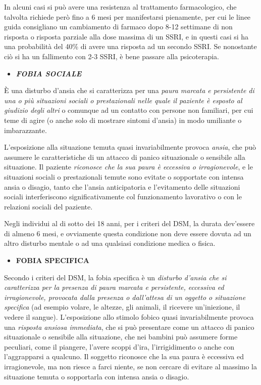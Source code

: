 \documentclass[]{article}
\begin{document}
In alcuni casi si può avere una resistenza al trattamento farmacologico,
che talvolta richiede però fino a 6 mesi per manifestarsi pienamente,
per cui le linee guida consigliano un cambiamento di farmaco dopo 8-12
settimane di non risposta o risposta parziale alla dose massima di un
SSRI, e in questi casi si ha una probabilità del 40\% di avere una
risposta ad un secondo SSRI. Se nonostante ciò si ha un fallimento con
2-3 SSRI, è bene passare alla psicoterapia.

\begin{itemize}
\item
  \textbf{\emph{FOBIA SOCIALE}}
\end{itemize}

È una disturbo d'ansia che si caratterizza per una \emph{paura marcata e
persistente di una o più situazioni sociali o prestazionali nelle quale
il paziente è esposto al giudizio degli altri} o comunque ad un contatto
con persone non familiari, per cui teme di agire (o anche solo di
mostrare sintomi d'ansia) in modo umiliante o imbarazzante.

L'esposizione alla situazione temuta quasi invariabilmente provoca
\emph{ansia}, che può assumere le caratteristiche di un attacco di
panico situazionale o sensibile alla situazione. Il paziente
\emph{riconosce che la sua paura è eccessiva o irragionevole}, e le
situazioni sociali o prestazionali temute sono evitate o sopportate con
intensa ansia o disagio, tanto che l'ansia anticipatoria e l'evitamento
delle situazioni sociali interferiscono significativamente col
funzionamento lavorativo o con le relazioni sociali del paziente.

Negli individui al di sotto dei 18 anni, per i criteri del DSM, la
durata dev'essere di almeno 6 mesi, e ovviamente questa condizione non
deve essere dovuta ad un altro disturbo mentale o ad una qualsiasi
condizione medica o fisica.

\begin{itemize}
\item
  \textbf{FOBIA SPECIFICA}
\end{itemize}

Secondo i criteri del DSM, la fobia specifica è un \emph{disturbo
d'ansia che si caratterizza per la presenza di paura marcata e
persistente, eccessiva ed irragionevole, provocata dalla presenza o
dall'attesa di un oggetto o situazione specifica} (ad esempio volare, le
altezze, gli animali, il ricevere un'iniezione, il vedere il sangue).
L'esposizione allo stimolo fobico quasi invariabilmente provoca una
\emph{risposta ansiosa immediata}, che si può presentare come un attacco
di panico situazionale o sensibile alla situazione, che nei bambini può
assumere forme peculiari, come il piangere, l'avere scoppi d'ira,
l'irrigidimento o anche con l'aggrapparsi a qualcuno. Il soggetto
riconosce che la sua paura è eccessiva ed irragionevole, ma non riesce a
farci niente, se non cercare di evitare al massimo la situazione temuta
o sopportarla con intensa ansia o disagio.
\end{document}
